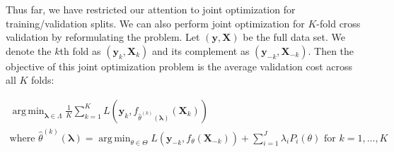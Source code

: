 \documentclass[10pt,letterpaper]{article}
\DeclareMathOperator*{\argmin}{arg\,min}
\begin{document}
\begin{algorithm}
\begin{algorithmic}
	\ENDFOR
  \end{algorithmic}
\end{algorithm}

Thus far, we have restricted our attention to joint optimization for training/validation splits. We can also perform joint optimization for $K$-fold cross validation by reformulating the problem. Let $(\boldsymbol y, \boldsymbol{X})$ be the full data set. We denote the $k$th fold as $(\boldsymbol y_{k}, \boldsymbol{X}_{k})$ and its complement as $(\boldsymbol y_{-k}, \boldsymbol{X}_{-k})$. Then the objective of this joint optimization problem is the average validation cost across all $K$ folds:

\begin{equation}
\begin{array}{c}
\argmin_{\boldsymbol{\lambda} \in \Lambda} \frac{1}{K} \sum_{k=1}^K L(\boldsymbol{y}_{k}, f_{\hat{\theta}^{(k)}(\boldsymbol{\lambda})}(\boldsymbol{X}_k)) \\
\text{where } {\hat{\theta}^{(k)}(\boldsymbol{\lambda})} = \argmin_{\theta \in \Theta} L(\boldsymbol{y}_{-k}, f_\theta (\boldsymbol{X}_{-k})) + \sum\limits_{i=1}^J \lambda_i P_i(\theta) \text{ for } k=1,...,K
\end{array}
\label{jointoptFullCV}
\end{equation}
\end{document}
